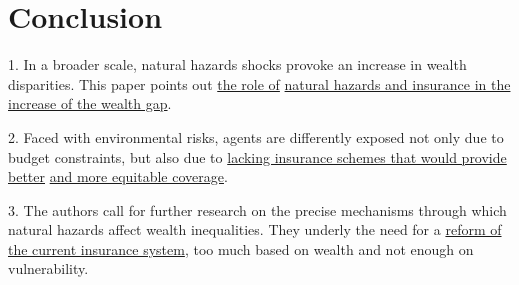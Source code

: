 \documentclass{beamer}
\begin{document}
\section{Conclusion}
    \begin{frame}{\secname}
        1. In a broader scale, natural hazards shocks provoke an increase in wealth disparities. 
        This paper points out \underline{the role of}
        \underline{natural hazards and insurance in the increase of the wealth gap}.

        2. Faced with environmental risks, agents are differently exposed not only due to budget constraints,
        but also due to \underline{lacking insurance schemes that would provide better} \underline{and more equitable
        coverage}.
        
        3. The authors call for further research on the precise mechanisms through which natural hazards affect wealth inequalities.
        They underly the need for a \underline{reform of} \underline{the current insurance system}, too much based on wealth and not enough on vulnerability.
    \end{frame}
\end{document}
